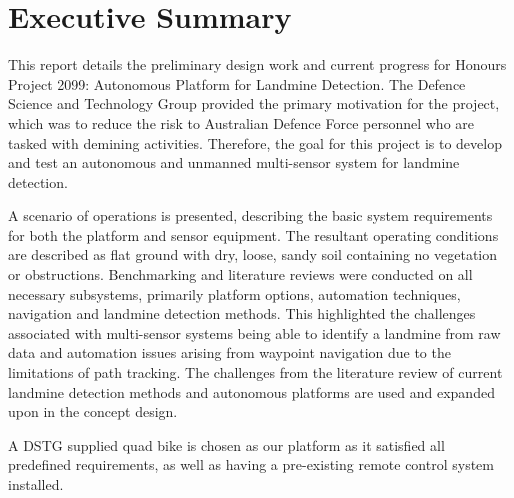 \documentclass[main.tex]{subfiles}
\begin{document}

{}	%
\chapter*{Executive Summary}
This report details the preliminary design work and current progress for Honours Project 2099: Autonomous Platform for Landmine Detection. The Defence Science and Technology Group provided the primary motivation for the project, which was to reduce the risk to Australian Defence Force personnel who are tasked with demining activities. Therefore, the goal for this project is to develop and test an autonomous and unmanned multi-sensor system for landmine detection. 

A scenario of operations is presented, describing the basic system requirements for both the platform and sensor equipment. The resultant operating conditions are described as flat ground with dry, loose, sandy soil containing no vegetation or obstructions. Benchmarking and literature reviews were conducted on all necessary subsystems, primarily platform options, automation techniques, navigation and landmine detection methods. This highlighted the challenges associated with multi-sensor systems being able to identify a landmine from raw data and automation issues arising from waypoint navigation due to the limitations of path tracking. The challenges from the literature review of current landmine detection methods and autonomous platforms are used and expanded upon in the concept design. 

A DSTG supplied quad bike is chosen as our platform as it satisfied all predefined requirements, as well as having a pre-existing remote control system installed.

\end{document}
